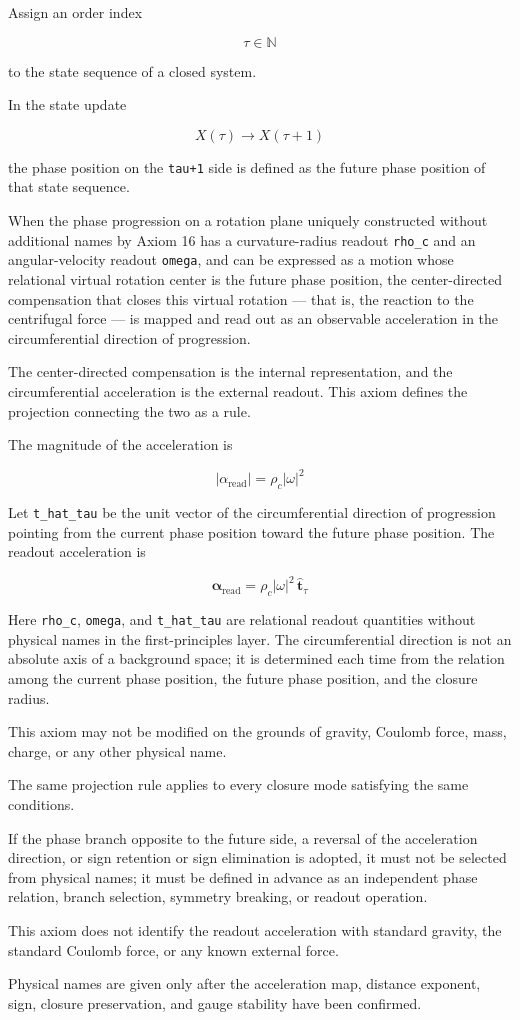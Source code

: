 \documentclass[
  a4paper,
]{article}
\begin{document}
Assign an order index

\[
\tau\in\mathbb{N}
\]

to the state sequence of a closed system.

In the state update

\[
X(\tau)\longrightarrow X(\tau+1)
\]

the phase position on the \texttt{tau+1} side is defined as the future
phase position of that state sequence.

When the phase progression on a rotation plane uniquely constructed
without additional names by Axiom 16 has a curvature-radius readout
\texttt{rho\_c} and an angular-velocity readout \texttt{omega}, and can
be expressed as a motion whose relational virtual rotation center is the
future phase position, the center-directed compensation that closes this
virtual rotation --- that is, the reaction to the centrifugal force ---
is mapped and read out as an observable acceleration in the
circumferential direction of progression.

The center-directed compensation is the internal representation, and the
circumferential acceleration is the external readout. This axiom defines
the projection connecting the two as a rule.

The magnitude of the acceleration is

\[
|\alpha_{\mathrm{read}}|
=\rho_c|\omega|^2
\]

Let \texttt{t\_hat\_tau} be the unit vector of the circumferential
direction of progression pointing from the current phase position toward
the future phase position. The readout acceleration is

\[
\boldsymbol{\alpha}_{\mathrm{read}}
=\rho_c|\omega|^2\,\hat{\boldsymbol{t}}_\tau
\]

Here \texttt{rho\_c}, \texttt{omega}, and \texttt{t\_hat\_tau} are
relational readout quantities without physical names in the
first-principles layer. The circumferential direction is not an absolute
axis of a background space; it is determined each time from the relation
among the current phase position, the future phase position, and the
closure radius.

This axiom may not be modified on the grounds of gravity, Coulomb force,
mass, charge, or any other physical name.

The same projection rule applies to every closure mode satisfying the
same conditions.

If the phase branch opposite to the future side, a reversal of the
acceleration direction, or sign retention or sign elimination is
adopted, it must not be selected from physical names; it must be defined
in advance as an independent phase relation, branch selection, symmetry
breaking, or readout operation.

This axiom does not identify the readout acceleration with standard
gravity, the standard Coulomb force, or any known external force.

Physical names are given only after the acceleration map, distance
exponent, sign, closure preservation, and gauge stability have been
confirmed.
\end{document}
